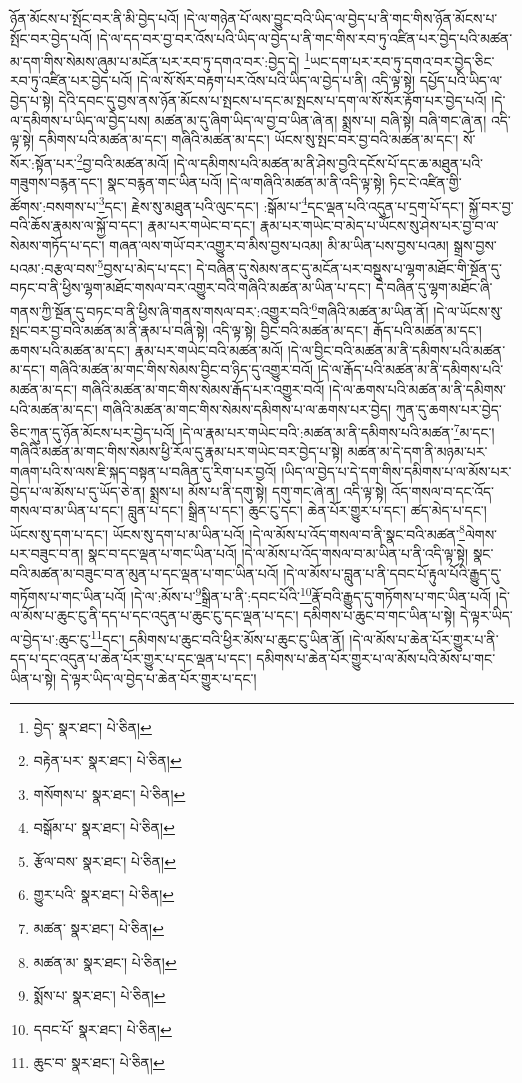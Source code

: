 ཉོན་མོངས་པ་སྤོང་བར་ནི་མི་བྱེད་པའོ། །དེ་ལ་གཉེན་པོ་ལས་བྱུང་བའི་ཡིད་ལ་བྱེད་པ་ནི་གང་གིས་ཉོན་མོངས་པ་སྤོང་བར་བྱེད་པའོ། །དེ་ལ་དད་བར་བྱ་བར་འོས་པའི་ཡིད་ལ་བྱེད་པ་ནི་གང་གིས་རབ་ཏུ་འཛིན་པར་བྱེད་པའི་མཚན་མ་དག་གིས་སེམས་ཞུམ་པ་མངོན་པར་རབ་ཏུ་དགའ་བར་:བྱེད་དེ། \footnote{བྱེད་  སྣར་ཐང་།  པེ་ཅིན། }ཡང་དག་པར་རབ་ཏུ་དགའ་བར་བྱེད་ཅིང་རབ་ཏུ་འཛིན་པར་བྱེད་པའོ། །དེ་ལ་སོ་སོར་བརྟག་པར་འོས་པའི་ཡིད་ལ་བྱེད་པ་ནི། འདི་ལྟ་སྟེ། དཔྱོད་པའི་ཡིད་ལ་བྱེད་པ་སྟེ། དེའི་དབང་དུ་བྱས་ནས་ཉོན་མོངས་པ་སྤངས་པ་དང་མ་སྤངས་པ་དག་ལ་སོ་སོར་རྟོག་པར་བྱེད་པའོ། །དེ་ལ་དམིགས་པ་ཡིད་ལ་བྱེད་པས། མཚན་མ་དུ་ཞིག་ཡིད་ལ་བྱ་བ་ཡིན་ཞེ་ན། སྨྲས་པ། བཞི་སྟེ། བཞི་གང་ཞེ་ན། འདི་ལྟ་སྟེ། དམིགས་པའི་མཚན་མ་དང་། གཞིའི་མཚན་མ་དང་། ཡོངས་སུ་སྤང་བར་བྱ་བའི་མཚན་མ་དང་། སོ་སོར་:སྟོན་པར་\footnote{བརྟེན་པར་  སྣར་ཐང་།  པེ་ཅིན། }བྱ་བའི་མཚན་མའོ། །དེ་ལ་དམིགས་པའི་མཚན་མ་ནི་ཤེས་བྱའི་དངོས་པོ་དང་ཆ་མཐུན་པའི་གཟུགས་བརྙན་དང་། སྣང་བརྙན་གང་ཡིན་པའོ། །དེ་ལ་གཞིའི་མཚན་མ་ནི་འདི་ལྟ་སྟེ། ཏིང་ངེ་འཛིན་གྱི་ཚོགས་:བསགས་པ་\footnote{གསོགས་པ་  སྣར་ཐང་།  པེ་ཅིན། }དང་། རྗེས་སུ་མཐུན་པའི་ལུང་དང་། :སྒོམ་པ་\footnote{བསྒོམ་པ་  སྣར་ཐང་།  པེ་ཅིན། }དང་ལྡན་པའི་འདུན་པ་དྲག་པོ་དང་། སྐྱོ་བར་བྱ་བའི་ཆོས་རྣམས་ལ་སྐྱོ་བ་དང་། རྣམ་པར་གཡེང་བ་དང་། རྣམ་པར་གཡེང་བ་མེད་པ་ཡོངས་སུ་ཤེས་པར་བྱ་བ་ལ་སེམས་གཏོད་པ་དང་། གཞན་ལས་གཡོ་བར་འགྱུར་བ་མིས་བྱས་པའམ། མི་མ་ཡིན་པས་བྱས་པའམ། སྒྲས་བྱས་པའམ་:བརྩལ་བས་\footnote{རྩོལ་བས་  སྣར་ཐང་།  པེ་ཅིན། }བྱས་པ་མེད་པ་དང་། དེ་བཞིན་དུ་སེམས་ནང་དུ་མངོན་པར་བསྡུས་པ་ལྷག་མཐོང་གི་སྔོན་དུ་བཏང་བ་ནི་ཕྱིས་ལྷག་མཐོང་གསལ་བར་འགྱུར་བའི་གཞིའི་མཚན་མ་ཡིན་པ་དང་། དེ་བཞིན་དུ་ལྷག་མཐོང་ཞི་གནས་ཀྱི་སྔོན་དུ་བཏང་བ་ནི་ཕྱིས་ཞི་གནས་གསལ་བར་:འགྱུར་བའི་\footnote{གྱུར་པའི་  སྣར་ཐང་།  པེ་ཅིན། }གཞིའི་མཚན་མ་ཡིན་ནོ། །དེ་ལ་ཡོངས་སུ་སྤང་བར་བྱ་བའི་མཚན་མ་ནི་རྣམ་པ་བཞི་སྟེ། འདི་ལྟ་སྟེ། བྱིང་བའི་མཚན་མ་དང་། རྒོད་པའི་མཚན་མ་དང་། ཆགས་པའི་མཚན་མ་དང་། རྣམ་པར་གཡེང་བའི་མཚན་མའོ། །དེ་ལ་བྱིང་བའི་མཚན་མ་ནི་དམིགས་པའི་མཚན་མ་དང་། གཞིའི་མཚན་མ་གང་གིས་སེམས་བྱིང་བ་ཉིད་དུ་འགྱུར་བའོ། །དེ་ལ་རྒོད་པའི་མཚན་མ་ནི་དམིགས་པའི་མཚན་མ་དང་། གཞིའི་མཚན་མ་གང་གིས་སེམས་རྒོད་པར་འགྱུར་བའོ། །དེ་ལ་ཆགས་པའི་མཚན་མ་ནི་དམིགས་པའི་མཚན་མ་དང་། གཞིའི་མཚན་མ་གང་གིས་སེམས་དམིགས་པ་ལ་ཆགས་པར་བྱེད། ཀུན་དུ་ཆགས་པར་བྱེད་ཅིང་ཀུན་དུ་ཉོན་མོངས་པར་བྱེད་པའོ། །དེ་ལ་རྣམ་པར་གཡེང་བའི་:མཚན་མ་ནི་དམིགས་པའི་མཚན་\footnote{མཚན་  སྣར་ཐང་།  པེ་ཅིན། }མ་དང་། གཞིའི་མཚན་མ་གང་གིས་སེམས་ཕྱི་རོལ་དུ་རྣམ་པར་གཡེང་བར་བྱེད་པ་སྟེ། མཚན་མ་དེ་དག་ནི་མཉམ་པར་གཞག་པའི་ས་ལས་ཇི་སྐད་བསྟན་པ་བཞིན་དུ་རིག་པར་བྱའོ། །ཡིད་ལ་བྱེད་པ་དེ་དག་གིས་དམིགས་པ་ལ་མོས་པར་བྱེད་པ་ལ་མོས་པ་དུ་ཡོད་ཅེ་ན། སྨྲས་པ། མོས་པ་ནི་དགུ་སྟེ། དགུ་གང་ཞེ་ན། འདི་ལྟ་སྟེ། འོད་གསལ་བ་དང་འོད་གསལ་བ་མ་ཡིན་པ་དང་། བླུན་པ་དང་། སྒྲིན་པ་དང་། ཆུང་ངུ་དང་། ཆེན་པོར་གྱུར་པ་དང་། ཚད་མེད་པ་དང་། ཡོངས་སུ་དག་པ་དང་། ཡོངས་སུ་དག་པ་མ་ཡིན་པའོ། །དེ་ལ་མོས་པ་འོད་གསལ་བ་ནི་སྣང་བའི་མཚན་\footnote{མཚན་མ་  སྣར་ཐང་།  པེ་ཅིན། }ལེགས་པར་བཟུང་བ་ན། སྣང་བ་དང་ལྡན་པ་གང་ཡིན་པའོ། །དེ་ལ་མོས་པ་འོད་གསལ་བ་མ་ཡིན་པ་ནི་འདི་ལྟ་སྟེ། སྣང་བའི་མཚན་མ་བཟུང་བ་ན་མུན་པ་དང་ལྡན་པ་གང་ཡིན་པའོ། །དེ་ལ་མོས་པ་བླུན་པ་ནི་དབང་པོ་རྟུལ་པོའི་རྒྱུད་དུ་གཏོགས་པ་གང་ཡིན་པའོ། །དེ་ལ་:མོས་པ་\footnote{སྨོས་པ་  སྣར་ཐང་།  པེ་ཅིན། }སྒྲིན་པ་ནི་:དབང་པོའི་\footnote{དབང་པོ་  སྣར་ཐང་།  པེ་ཅིན། }རྣོ་བའི་རྒྱུད་དུ་གཏོགས་པ་གང་ཡིན་པའོ། །དེ་ལ་མོས་པ་ཆུང་ངུ་ནི་དད་པ་དང་འདུན་པ་ཆུང་ངུ་དང་ལྡན་པ་དང་། དམིགས་པ་ཆུང་བ་གང་ཡིན་པ་སྟེ། དེ་ལྟར་ཡིད་ལ་བྱེད་པ་:ཆུང་ངུ་\footnote{ཆུང་བ་  སྣར་ཐང་།  པེ་ཅིན། }དང་། དམིགས་པ་ཆུང་བའི་ཕྱིར་མོས་པ་ཆུང་ངུ་ཡིན་ནོ། །དེ་ལ་མོས་པ་ཆེན་པོར་གྱུར་པ་ནི་དད་པ་དང་འདུན་པ་ཆེན་པོར་གྱུར་པ་དང་ལྡན་པ་དང་། དམིགས་པ་ཆེན་པོར་གྱུར་པ་ལ་མོས་པའི་མོས་པ་གང་ཡིན་པ་སྟེ། དེ་ལྟར་ཡིད་ལ་བྱེད་པ་ཆེན་པོར་གྱུར་པ་དང་། 
